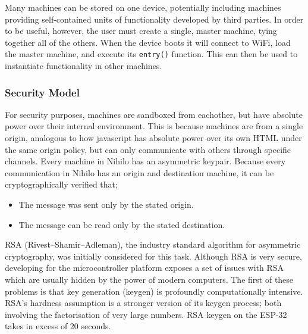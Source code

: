 \documentclass{article}
\begin{document}
Many machines can be stored on one device, potentially including machines providing self-contained units of functionality developed by third parties. In order to be useful, however, the user must create a single, master machine, tying together all of the others. When the device boots it will connect to WiFi, load the master machine, and execute its \texttt{entry()} function. This can then be used to instantiate functionality in other machines.

\subsubsection{Security Model}

For security purposes, machines are sandboxed from eachother, but have absolute power over their internal environment. This is because machines are from a single origin, analogous to how javascript has absolute power over its own HTML under the same origin policy, but can only communicate with others through specific channels. Every machine in Nihilo has an asymmetric keypair. Because every communication in Nihilo has an origin and destination machine, it can be cryptographically verified that;
\begin{itemize}
\item The message was sent only by the stated origin.
\item The message can be read only by the stated destination.
\end{itemize}

RSA (Rivest–Shamir–Adleman)\cite{rsa}, the industry standard algorithm for asymmetric cryptography, was initially considered for this task. Although RSA is very secure, developing for the microcontroller platform exposes a set of issues with RSA which are usually hidden by the power of modern computers. The first of these problems is that key generation (keygen) is profoundly computationally intensive. RSA's hardness assumption is a stronger version of its keygen process; both involving the factorisation of very large numbers. RSA keygen on the ESP-32 takes in excess of 20 seconds.
\end{document}
